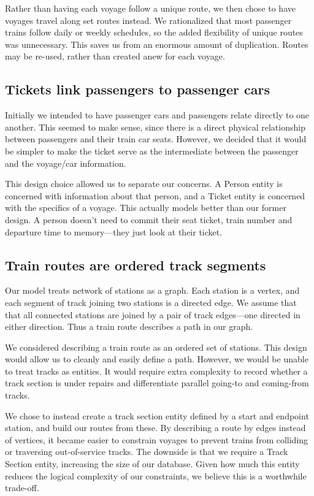 \documentclass[a4paper]{article}
\begin{document}
Rather than having each voyage follow a unique route, we then chose to have voyages travel along set routes instead. We rationalized that most passenger trains follow daily or weekly schedules, so the added flexibility of unique routes was unnecessary. This saves us from an enormous amount of duplication. Routes may be re-used, rather than created anew for each voyage.

\subsection*{Tickets link passengers to passenger cars}
Initially we intended to have passenger cars and passengers relate directly to one another. This seemed to make sense, since there is a direct physical relationship between passengers and their train car seats. However, we decided that it would be simpler to make the ticket serve as the intermediate between the passenger and the voyage/car information.

This design choice allowed us to separate our concerns. A Person entity is concerned with information about that person, and a Ticket entity is concerned with the specifics of a voyage. This actually models better than our former design. A person doesn’t need to commit their seat ticket, train number and departure time to memory—they just look at their ticket.

\subsection*{Train routes are ordered track segments}
Our model treats network of stations as a graph. Each station is a vertex, and each segment of track joining two stations is a directed edge. We assume that that all connected stations are joined by a pair of track edges—one directed in either direction. Thus a train route describes a path in our graph.

We considered describing a train route as an ordered set of stations. This design would allow us to cleanly and easily define a path. However, we would be unable to treat tracks as entities. It would require extra complexity to record whether a track section is under repairs and differentiate parallel going-to and coming-from tracks.

We chose to instead create a track section entity defined by a start and endpoint station, and build our routes from these. By describing a route by edges instead of vertices, it became easier to constrain voyages to prevent trains from colliding or traversing out-of-service tracks. The downside is that we require a Track Section entity, increasing the size of our database. Given how much this entity reduces the logical complexity of our constraints, we believe this is a worthwhile trade-off.
\end{document}

